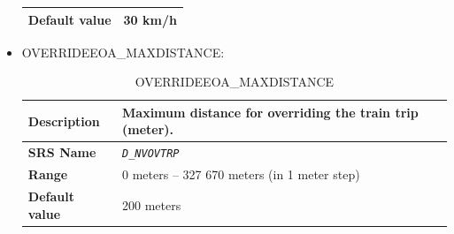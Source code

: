 \documentclass{template/openetcs}
\begin{document}
\begin{itemize}
\begin{longtable}{|l|l|}
				\hline
										
					\begin{minipage}[t]{0.22\linewidth} \textbf{Default value}	\end{minipage} 
				&	\begin{minipage}[t]{0.78\linewidth} 30 km/h \end{minipage} \\
				
				\hline
				
			\end{longtable}
					
		\item OVERRIDEEOA\_MAXDISTANCE:
		
			\begin{longtable}{|l|l|}
				\caption{OVERRIDEEOA\_MAXDISTANCE}\\ 																						
				\hline
				
					\begin{minipage}[t]{0.22\linewidth} \textbf{Description}	\end{minipage} 
				&	\begin{minipage}[t]{0.78\linewidth} Maximum distance for overriding the train trip (meter). \end{minipage} \\
				
				\hline
				
					\begin{minipage}[t]{0.22\linewidth} \textbf{SRS Name}	\end{minipage} 
				&	\begin{minipage}[t]{0.78\linewidth} \emph{\texttt{D\_NVOVTRP}} \end{minipage} \\
				
				\hline
																																
					\begin{minipage}[t]{0.22\linewidth} \textbf{Range}	\end{minipage} 
				&	\begin{minipage}[t]{0.78\linewidth} 0 meters – 327 670 meters (in 1 meter step) \end{minipage} \\
								
				\hline
										
					\begin{minipage}[t]{0.22\linewidth} \textbf{Default value}	\end{minipage} 
				&	\begin{minipage}[t]{0.78\linewidth} 200 meters \end{minipage} \\
				

\end{longtable}
\end{itemize}
\end{document}
